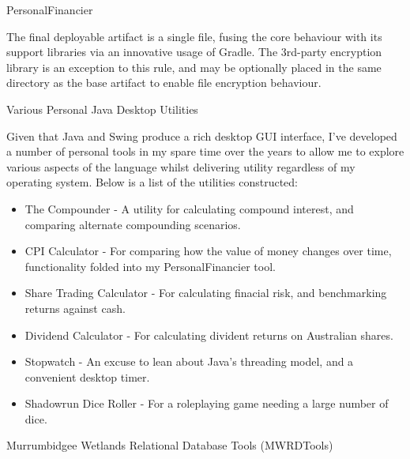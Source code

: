\documentclass{portfolio}
\begin{document}
\begin{Projects}
\begin{Project}{PersonalFinancier}
\begin{ProjectOverview}
        The final deployable artifact is a single file, fusing the core behaviour with its support libraries via an innovative usage of 
        Gradle. The 3rd-party encryption library is an exception to this rule, and may be optionally placed in the same directory as the 
        base artifact to enable file encryption behaviour.
      \end{ProjectOverview}
    \end{Project}
    \begin{Project}{Various Personal Java Desktop Utilities}
      \begin{ProjectOverview}
        Given that Java and Swing produce a rich desktop GUI interface, I've developed a number of personal tools in my spare time over the years to allow me to 
        explore various aspects of the language whilst delivering utility regardless of my operating system. Below is a list of the utilities constructed:
        \begin{itemize}
           \item The Compounder - A utility for calculating compound interest, and comparing alternate compounding scenarios.
           \item CPI Calculator - For comparing how the value of money changes over time, functionality folded into my PersonalFinancier tool.
           \item Share Trading Calculator - For calculating finacial risk, and benchmarking returns against cash. 
           \item Dividend Calculator - For calculating divident returns on Australian shares.
           \item Stopwatch - An excuse to lean about Java's threading model, and a convenient desktop timer.
           \item Shadowrun Dice Roller - For a roleplaying game needing a large number of dice.
        \end{itemize}
      \end{ProjectOverview}
    \end{Project}
    \begin{Project}{Murrumbidgee Wetlands Relational Database Tools (MWRDTools)}

\end{Project}
\end{Projects}
\end{document}
